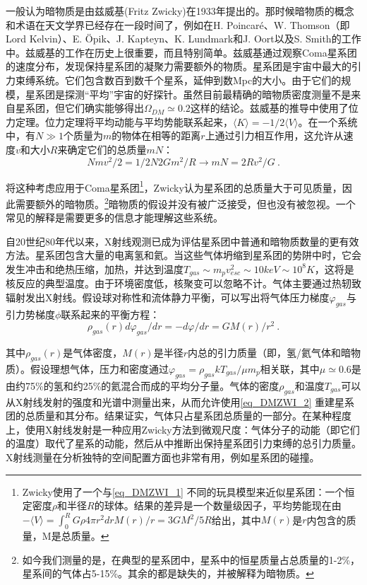 

一般认为暗物质是由兹威基(Fritz Zwicky)在1933年提出的。那时候暗物质的概念和术语在天文学界已经存在一段时间了，例如在H. Poincaré、W. Thomson（即Lord Kelvin）、E. Öpik、J. Kapteyn、K. Lundmark和J. Oort以及S. Smith的工作中。兹威基的工作在历史上很重要，而且特别简单。兹威基通过观察Coma星系团的速度分布，发现保持星系团的凝聚力需要额外的物质。星系团是宇宙中最大的引力束缚系统。它们包含数百到数千个星系，延伸到数Mpc的大小。由于它们的规模，星系团是探测“平均”宇宙的好探针。虽然目前最精确的暗物质密度测量不是来自星系团，但它们确实能够得出$\Omega_{DM} \simeq 0.2$这样的结论。兹威基的推导中使用了位力定理。位力定理将平均动能与平均势能联系起来，$\langle K \rangle  = -1/2 \langle V \rangle $。在一个系统中，有$N \gg 1$个质量为$m$的物体在相等的距离$r$上通过引力相互作用，这允许从速度$v$和大小$R$来确定它们的总质量$mN$：
\begin{equation}\label{eq_DMZWI_1}
N mv^2 / 2 = 1/2 N2 G m^2 / R \rightarrow mN = 2R v^2 / G  ~.
\end{equation}


将这种考虑应用于Coma星系团\footnote{Zwicky使用了一个与\autoref{eq_DMZWI_1} 不同的玩具模型来近似星系团：一个恒定密度$\rho$和半径$R$的球体。结果的差异是一个数量级因子，平均势能现在由$-\langle V\rangle = \int^R_0 G \rho 4\pi r^2 dr M(r)/r = 3GM^2/5 R$给出，其中$M(r)$是$r$内包含的质量，M是总质量。}，Zwicky认为星系团的总质量大于可见质量，因此需要额外的暗物质。\footnote{如今我们测量的是，在典型的星系团中，星系中的恒星质量占总质量的1-2\%，星系间的气体占5-15\%。其余的都是缺失的，并被解释为暗物质。}暗物质的假设并没有被广泛接受，但也没有被忽视。一个常见的解释是需要更多的信息才能理解这些系统。

自20世纪80年代以来，X射线观测已成为评估星系团中普通和暗物质数量的更有效方法。星系团包含大量的电离氢和氦。当这些气体坍缩到星系团的势阱中时，它会发生冲击和绝热压缩，加热，并达到温度$T_{gas} \sim m_pv^2_{esc} \sim 10 keV \sim  10^8 K$，这将是核反应的典型温度。由于环境密度低，核聚变可以忽略不计。气体主要通过热轫致辐射发出X射线。假设球对称性和流体静力平衡，可以写出将气体压力梯度$\varphi_{gas}$与引力势梯度$\phi$联系起来的平衡方程：
\begin{equation}\label{eq_DMZWI_2}
\rho_{gas}(r) d\varphi_{gas}/dr = - d\varphi / dr = GM(r)/ r^2~. 
\end{equation}
 

其中$\rho_{gas}(r)$是气体密度，$M(r)$是半径$r$内总的引力质量（即，氢/氦气体和暗物质）。假设理想气体，压力和密度通过$\varphi_{gas} = \rho_{gas}kT_{gas}/\mu m_p$相关联，其中$\mu\simeq 0.6$是由约75\%的氢和约25\%的氦混合而成的平均分子量。气体的密度$\rho_{gas}$和温度$T_{gas}$可以从X射线发射的强度和光谱中测量出来，从而允许使用\autoref{eq_DMZWI_2} 重建星系团的总质量和其分布。结果证实，气体只占星系团总质量的一部分。在某种程度上，使用X射线发射是一种应用Zwicky方法到微观尺度：气体分子的动能（即它们的温度）取代了星系的动能，然后从中推断出保持星系团引力束缚的总引力质量。X射线测量在分析独特的空间配置方面也非常有用，例如星系团的碰撞。



